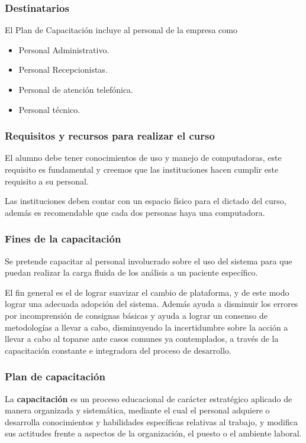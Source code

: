 \documentclass[a4paper,12pt]{article}
\begin{document}
\subsubsection{Destinatarios}
El Plan de Capacitación incluye al personal de la empresa como
\begin{itemize}
	\item Personal Administrativo.
	\item Personal Recepcionistas.
	\item Personal de atención telefónica.
	\item Personal técnico.
\end{itemize}


\subsubsection{Requisitos y recursos para realizar el curso}
	El alumno debe tener conocimientos de uso y manejo de computadoras, este requisito es fundamental y creemos que las instituciones hacen cumplir este requisito a su personal.
	
	Las instituciones deben contar con un espacio físico para el dictado del curso, además es recomendable que cada dos personas haya una computadora.
	
\subsubsection{Fines de la capacitación}
Se pretende capacitar al personal involucrado sobre el uso del sistema para que puedan realizar la carga fluida de los análisis a un  paciente específico.

El fin general es el de  lograr suavizar el cambio de plataforma, y de este modo lograr una adecuada adopción del sistema. Además ayuda a disminuir los errores por incomprensión de consignas básicas y ayuda a lograr un consenso de metodologías a llevar a cabo, disminuyendo la incertidumbre  sobre la acción a llevar a cabo al toparse ante casos comunes ya contemplados, a través de la capacitación constante e integradora del  proceso de desarrollo.

 

\subsubsection{Plan de capacitación}
La \textbf{capacitación} es un proceso educacional de carácter estratégico aplicado de
manera organizada y sistemática, mediante el cual el personal adquiere o desarrolla
conocimientos y habilidades específicas relativas al trabajo, y modifica sus actitudes
frente a aspectos de la organización, el puesto o el ambiente laboral.
\end{document}
